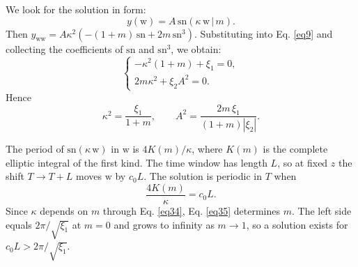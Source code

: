 \documentclass{article}
\begin{document}
                We look for the solution in form:
                \begin{equation} \label{eq32}
                    y\left(\mathrm{w}\right) = A\,\mathrm{sn}\left(\kappa\,\mathrm{w}\,|\,m\right).
                \end{equation}
                Then \(y_{\mathrm{ww}} = A\kappa^{2}\left(-(1+m)\,\mathrm{sn} + 2m\,\mathrm{sn}^{3}\right)\). Substituting into Eq. \ref{eq9} and collecting the coefficients of \(\mathrm{sn}\) and \(\mathrm{sn}^{3}\), we obtain:
                \begin{equation} \label{eq33}
                    \begin{cases}
                        \displaystyle -\kappa^{2}\left(1+m\right) + \xi_{1} = 0,\\
                        \displaystyle 2m\kappa^{2} + \xi_{2}A^{2} = 0.
                    \end{cases}
                \end{equation}
                Hence
                \begin{equation} \label{eq34}
                    \kappa^{2} = \frac{\xi_{1}}{1+m}, \qquad A^{2} = \frac{2m\,\xi_{1}}{\left(1+m\right)\left|\xi_{2}\right|}.
                \end{equation}

                The period of \(\mathrm{sn}\left(\kappa\,\mathrm{w}\right)\) in \(\mathrm{w}\) is \(4K(m)/\kappa\), where \(K(m)\) is the complete elliptic integral of the first kind. The time window has length \(L\), so at fixed \(z\) the shift \(T \to T+L\) moves \(\mathrm{w}\) by \(c_{0}L\). The solution is periodic in \(T\) when
                \begin{equation} \label{eq35}
                    \frac{4K(m)}{\kappa} = c_{0}L.
                \end{equation}
                Since \(\kappa\) depends on \(m\) through Eq. \ref{eq34}, Eq. \ref{eq35} determines \(m\). The left side equals \(2\pi/\sqrt{\xi_{1}}\) at \(m=0\) and grows to infinity as \(m \to 1\), so a solution exists for \(c_{0}L > 2\pi/\sqrt{\xi_{1}}\).
\end{document}
